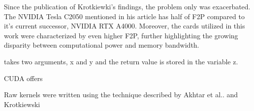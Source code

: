 Since the publication of Krotkiewki's findings, the problem only was exacerbated. The NVIDIA Tesla C2050 mentioned in his article has half of F2P compared to it's current successor, NVIDIA RTX A4000. Moreover, the cards utilized in this work were characterized by even higher F2P, further highlighting the growing disparity between computational power and memory bandwidth.
\vspace{0.2cm}

takes two arguments, x and y and the return value is stored in the variable z.

CUDA offers 

Raw kernels were written using the technique described by Akhtar et al.\cite{akhtar2018efficient}. and Krotkiewski \cite{krotkiewski2013efficient}



\cite{learn_cuda}
\cite{cheng2014professional}




